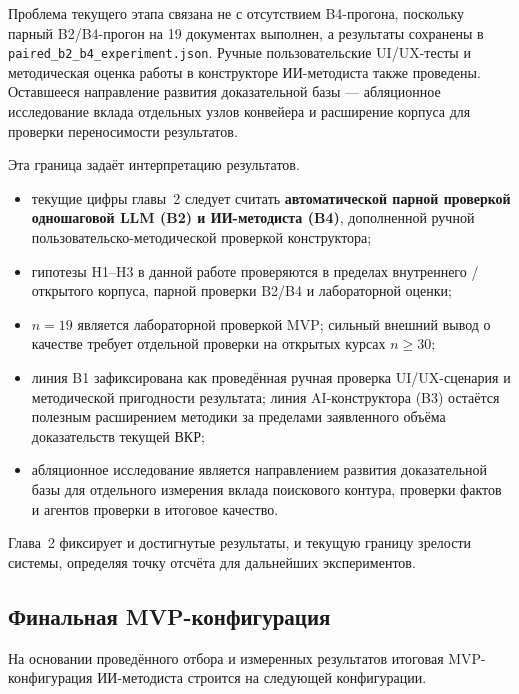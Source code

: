 Проблема текущего этапа связана не с отсутствием B4-прогона, поскольку парный
B2/B4-прогон на 19 документах выполнен, а результаты сохранены
в \texttt{paired\_b2\_b4\_experiment.json}. Ручные пользовательские
UI/UX-тесты и методическая оценка работы в конструкторе ИИ-методиста
также проведены. Оставшееся направление развития доказательной базы —
абляционное исследование вклада отдельных узлов конвейера и расширение
корпуса для проверки переносимости результатов.

Эта граница задаёт интерпретацию результатов.

\begin{itemize}
  \item текущие цифры главы~2 следует считать
    \textbf{автоматической парной проверкой одношаговой LLM (B2)
    и ИИ-методиста (B4)}, дополненной ручной
    пользовательско-методической проверкой конструктора;
  \item гипотезы H1–H3 в данной работе проверяются в пределах
    внутреннего / открытого корпуса, парной проверки B2/B4 и лабораторной оценки;
  \item $n = 19$ является лабораторной проверкой MVP; сильный внешний вывод
    о качестве требует отдельной проверки на открытых курсах $n \geq 30$;
  \item линия B1 зафиксирована как проведённая ручная проверка
    UI/UX-сценария и методической пригодности результата; линия
    AI-конструктора (B3) остаётся полезным расширением методики
    за пределами заявленного объёма доказательств текущей ВКР;
  \item абляционное исследование является направлением развития
    доказательной базы для отдельного измерения вклада
    поискового контура, проверки фактов и агентов проверки в итоговое качество.
\end{itemize}

Глава~2 фиксирует и достигнутые результаты, и текущую границу
зрелости системы, определяя точку отсчёта для дальнейших экспериментов.

\subsection{Финальная MVP-конфигурация}

На основании проведённого отбора и измеренных результатов
итоговая MVP-конфигурация ИИ-методиста строится на следующей
конфигурации.

